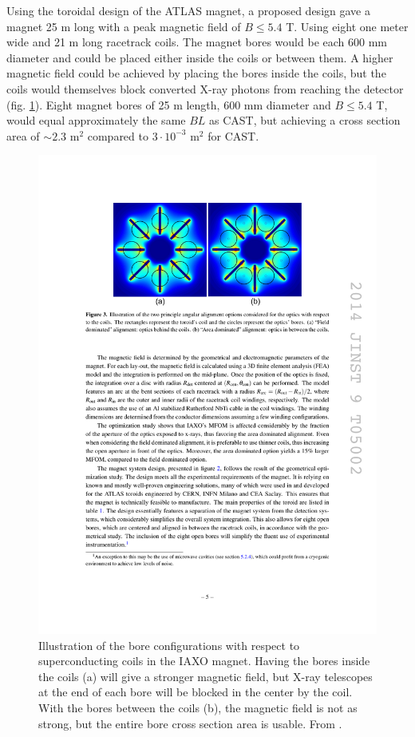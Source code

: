 Using the toroidal design of the ATLAS magnet, a proposed design gave a magnet 25 m long with a peak magnetic field of $B \leq 5.4$ T. Using eight one meter wide and 21 m long racetrack coils. The magnet bores would be each 600 mm diameter and could be placed either inside the coils or between them. A higher magnetic field could be achieved by placing the bores inside the coils, but the coils would themselves block converted X-ray photons from reaching the detector (fig. \ref{fig:toroid_field}). Eight magnet bores of 25 m length, 600 mm diameter and $B \leq 5.4$ T, would equal approximately the same $BL$ as CAST, but achieving a cross section area of $\sim2.3$ m$^2$ compared to $3\cdot10^{-3}$ m$^2$ for CAST.

\begin{figure}[!h]
  \center
\includegraphics[width=0.8\linewidth]{figures/iaxo/toroid_field.pdf}
\caption{\footnotesize Illustration of the bore configurations with respect to superconducting coils in the IAXO magnet. Having the bores inside the coils (a) will give a stronger magnetic field, but X-ray telescopes at the end of each bore will be blocked in the center by the coil. With the bores between the coils (b), the magnetic field is not as strong, but the entire bore cross section area is usable. From \cite{Irastorza:2013uu}.}\label{fig:toroid_field}
\end{figure}

